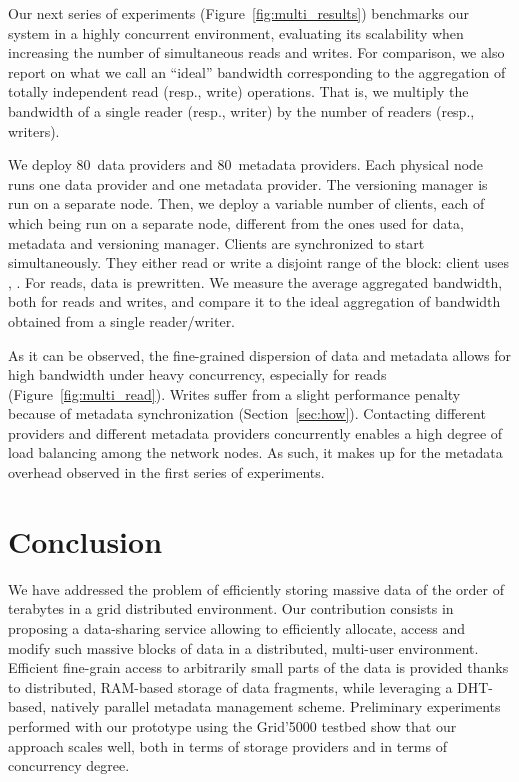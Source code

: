 \documentclass{llncs}
\begin{document}
Our next series of experiments (Figure~\ref{fig:multi_results})
benchmarks our system in a highly concurrent environment, evaluating
its scalability when increasing the number of simultaneous reads and
writes. For comparison, we also report on what we call an ``ideal''
bandwidth corresponding to the aggregation of totally independent read
(resp., write) operations. That is, we multiply the bandwidth
of a single reader (resp., writer) by the number of readers
(resp., writers).  

We deploy 80~data providers and 80~metadata
providers.
Each physical node runs one data provider and one metadata
provider. The versioning manager is run on a separate node.
Then, we deploy a variable number of
clients, each of which being run on a separate node, different
from the ones used for data, metadata and versioning manager. Clients
are synchronized to start simultaneously.  They either read or write a
disjoint range of the block: client  uses 
, .  For reads, data is prewritten. We measure the average
aggregated bandwidth, both for reads and writes, and compare it to the
ideal aggregation of bandwidth obtained from a single reader/writer.

As it can be observed, the fine-grained dispersion of data and metadata
allows for high bandwidth under heavy concurrency, especially for
reads (Figure~\ref{fig:multi_read}). Writes suffer from a slight
performance penalty because of metadata synchronization
(Section~\ref{sec:how}). Contacting different providers and different metadata
providers concurrently enables a high degree of load balancing among
the network nodes. As such, it makes up for the metadata overhead
observed in the first series of experiments.

\section{Conclusion}
\label{sec:conclusion}

We have addressed the problem of efficiently storing massive data of
the order of terabytes in a grid distributed environment. Our contribution
consists in proposing a data-sharing service allowing to efficiently
allocate, access and modify such massive blocks of data in a distributed,
multi-user environment. Efficient fine-grain access to arbitrarily
small parts of the data is provided thanks to distributed, RAM-based
storage of data fragments, while leveraging a DHT-based, natively 
parallel metadata management scheme. Preliminary experiments performed
with our prototype using the Grid'5000 testbed show that our approach
scales well, both in terms of storage providers and in terms of
concurrency degree.
\end{document}
